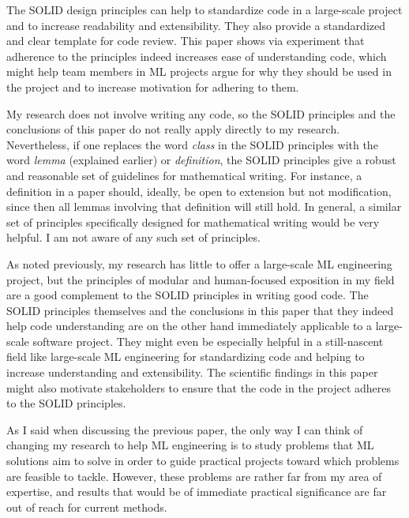 The SOLID design principles can help to standardize code in a large-scale project and to increase readability and extensibility. They also provide a standardized and clear template for code review. This paper shows via experiment that adherence to the principles indeed increases ease of understanding code, which might help team members in ML projects argue for why they should be used in the project and to increase motivation for adhering to them. 

My research does not involve writing any code, so the SOLID principles and the conclusions of this paper do not really apply directly to my research. Nevertheless, if one replaces the word \emph{class} in the SOLID principles with the word \emph{lemma} (explained earlier) or \emph{definition}, the SOLID principles give a robust and reasonable set of guidelines for mathematical writing. For instance, a definition in a paper should, ideally, be open to extension but not modification, since then all lemmas involving that definition will still hold. In general, a similar set of principles specifically designed for mathematical writing would be very helpful. I am not aware of any such set of principles. 

As noted previously, my research has little to offer a large-scale ML engineering project, but the principles of modular and human-focused exposition in my field  are a good complement to the SOLID principles in writing good code. The SOLID principles themselves and the conclusions in this paper that they indeed help code understanding are on the other hand immediately applicable to a large-scale software project. They might even be especially helpful in a still-nascent field like large-scale ML engineering for standardizing code and helping to increase understanding and extensibility. The scientific findings in this paper might also motivate stakeholders to ensure that the code in the project adheres to the SOLID principles. 

As I said when discussing the previous paper, the only way I can think of changing my research to help ML engineering is to study problems that ML solutions aim to solve in order to guide practical projects toward which problems are feasible to tackle. However, these problems are rather far from my area of expertise, and results that would be of immediate practical significance are far out of reach for current methods.



\printbibliography




